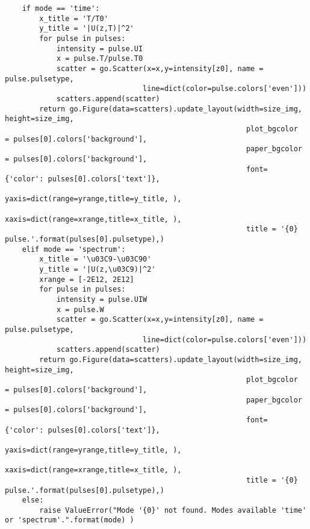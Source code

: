 \begin{verbatim}
    if mode == 'time':
        x_title = 'T/T0'
        y_title = '|U(z,T)|^2'
        for pulse in pulses:
            intensity = pulse.UI
            x = pulse.T/pulse.T0
            scatter = go.Scatter(x=x,y=intensity[z0], name = pulse.pulsetype,
                                line=dict(color=pulse.colors['even']))
            scatters.append(scatter)
        return go.Figure(data=scatters).update_layout(width=size_img, height=size_img,
                                                        plot_bgcolor  = pulses[0].colors['background'],
                                                        paper_bgcolor = pulses[0].colors['background'],
                                                        font= {'color': pulses[0].colors['text']},
                                                        yaxis=dict(range=yrange,title=y_title, ), 
                                                        xaxis=dict(range=xrange,title=x_title, ), 
                                                        title = '{0} pulse.'.format(pulses[0].pulsetype),)
    elif mode == 'spectrum':
        x_title = '\u03C9-\u03C90'
        y_title = '|U(z,\u03C9)|^2'
        xrange = [-2E12, 2E12]
        for pulse in pulses:
            intensity = pulse.UIW
            x = pulse.W
            scatter = go.Scatter(x=x,y=intensity[z0], name = pulse.pulsetype,
                                line=dict(color=pulse.colors['even']))
            scatters.append(scatter)
        return go.Figure(data=scatters).update_layout(width=size_img, height=size_img,
                                                        plot_bgcolor  = pulses[0].colors['background'],
                                                        paper_bgcolor = pulses[0].colors['background'],
                                                        font= {'color': pulses[0].colors['text']},
                                                        yaxis=dict(range=yrange,title=y_title, ), 
                                                        xaxis=dict(range=xrange,title=x_title, ), 
                                                        title = '{0} pulse.'.format(pulses[0].pulsetype),)
    else:
        raise ValueError("Mode '{0}' not found. Modes available 'time' or 'spectrum'.".format(mode) )
\end{verbatim}

